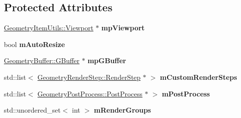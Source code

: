 \subsection*{Protected Attributes}
\begin{DoxyCompactItemize}
\item 
\mbox{\label{class_geometry_engine_1_1_geometry_world_item_1_1_geometry_camera_1_1_camera_ab002ae029654b7cd634433817f16daa0}} 
\mbox{\hyperlink{class_geometry_engine_1_1_geometry_item_utils_1_1_viewport}{Geometry\+Item\+Utils\+::\+Viewport}} $\ast$ {\bfseries mp\+Viewport}
\item 
\mbox{\label{class_geometry_engine_1_1_geometry_world_item_1_1_geometry_camera_1_1_camera_aca8086ce2a9f8d830410695c98bdda27}} 
bool {\bfseries m\+Auto\+Resize}
\item 
\mbox{\label{class_geometry_engine_1_1_geometry_world_item_1_1_geometry_camera_1_1_camera_acd3340f6a168f9b8623172f7f4a87a52}} 
\mbox{\hyperlink{class_geometry_engine_1_1_geometry_buffer_1_1_g_buffer}{Geometry\+Buffer\+::\+G\+Buffer}} $\ast$ {\bfseries mp\+G\+Buffer}
\item 
\mbox{\label{class_geometry_engine_1_1_geometry_world_item_1_1_geometry_camera_1_1_camera_ab9ce7bb084093ecadaac30c6e5226979}} 
std\+::list$<$ \mbox{\hyperlink{class_geometry_engine_1_1_geometry_render_step_1_1_render_step}{Geometry\+Render\+Step\+::\+Render\+Step}} $\ast$ $>$ {\bfseries m\+Custom\+Render\+Steps}
\item 
\mbox{\label{class_geometry_engine_1_1_geometry_world_item_1_1_geometry_camera_1_1_camera_ad0878809e17d2f3c5e87743f856829c3}} 
std\+::list$<$ \mbox{\hyperlink{class_geometry_engine_1_1_geometry_post_process_1_1_post_process}{Geometry\+Post\+Process\+::\+Post\+Process}} $\ast$ $>$ {\bfseries m\+Post\+Process}
\item 
\mbox{\label{class_geometry_engine_1_1_geometry_world_item_1_1_geometry_camera_1_1_camera_af259aa784248dfb877f0d929e099f42f}} 
std\+::unordered\+\_\+set$<$ int $>$ {\bfseries m\+Render\+Groups}
\end{DoxyCompactItemize}


